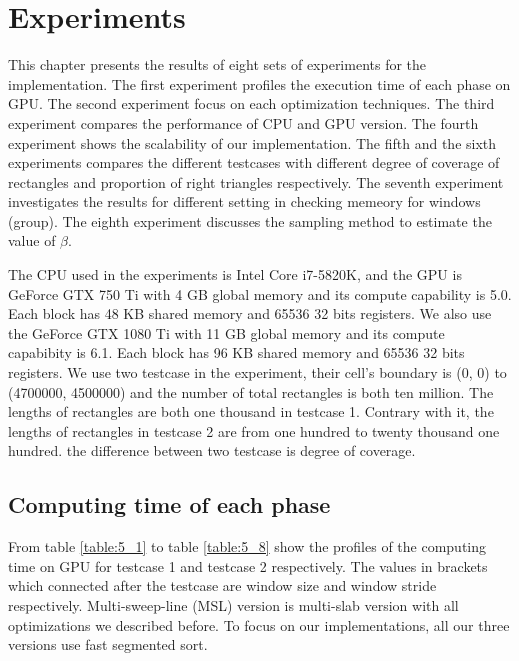 \chapter{Experiments}
\label{chap:experiments}
This chapter presents the results of eight sets of experiments for the implementation. The first experiment profiles the execution time of each phase on GPU. The second experiment focus on each optimization techniques. The third experiment compares the performance of CPU and GPU version. The fourth experiment shows the scalability of our implementation. The fifth and the sixth experiments compares the different testcases with different degree of coverage of rectangles and proportion of right triangles respectively. The seventh experiment investigates the results for different setting in checking memeory for windows (group). The eighth experiment discusses the sampling method to estimate the value of $\beta$.

The CPU used in the experiments is Intel Core i7-5820K, and the GPU is GeForce GTX 750 Ti with 4 GB global memory and its compute capability is 5.0. Each block has 48 KB shared memory and 65536 32 bits registers. We also use the GeForce GTX 1080 Ti with 11 GB global memory and its compute capabibity is 6.1. Each block has 96 KB shared memory and 65536 32 bits registers. We use two testcase in the experiment, their cell’s boundary is (0, 0) to (4700000, 4500000) and the number of total rectangles is both ten million. The lengths of rectangles are both one thousand in testcase 1. Contrary with it, the lengths of rectangles in testcase 2 are from one hundred to twenty thousand one hundred. the difference between two testcase is degree of coverage.

\section{Computing time of each phase}
From table \ref{table:5_1} to table \ref{table:5_8} show the profiles of the computing time on GPU for testcase 1 and testcase 2 respectively. The values in brackets which connected after the testcase are window size and window stride respectively. Multi-sweep-line (MSL) version is multi-slab version with all optimizations we described before. To focus on our implementations, all our three versions use fast segmented sort.


